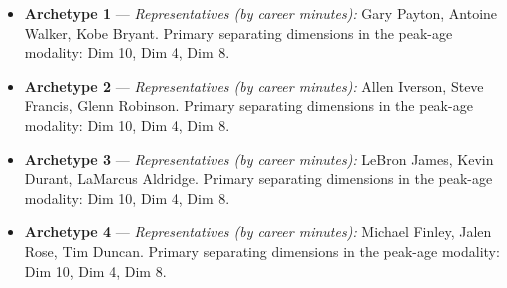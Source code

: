 \begin{itemize}
\item \textbf{Archetype 1} --- \emph{Representatives (by career minutes):} Gary Payton, Antoine Walker, Kobe Bryant. Primary separating dimensions in the peak-age modality: Dim 10, Dim 4, Dim 8.
\item \textbf{Archetype 2} --- \emph{Representatives (by career minutes):} Allen Iverson, Steve Francis, Glenn Robinson. Primary separating dimensions in the peak-age modality: Dim 10, Dim 4, Dim 8.
\item \textbf{Archetype 3} --- \emph{Representatives (by career minutes):} LeBron James, Kevin Durant, LaMarcus Aldridge. Primary separating dimensions in the peak-age modality: Dim 10, Dim 4, Dim 8.
\item \textbf{Archetype 4} --- \emph{Representatives (by career minutes):} Michael Finley, Jalen Rose, Tim Duncan. Primary separating dimensions in the peak-age modality: Dim 10, Dim 4, Dim 8.
\end{itemize}
